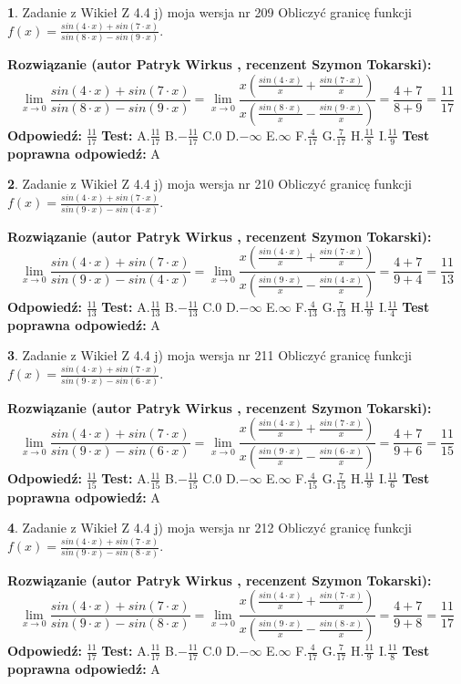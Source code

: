 \documentclass[12pt, a4paper]{article}
\theoremstyle{definition} %
\newtheorem{zad}{}
\newcommand{\zadStart}[1]{\begin{zad}#1\newline}
\newcommand{\zadStop}{\end{zad}}
\newcommand{\rozwStart}[2]{\noindent \textbf{Rozwiązanie (autor #1 , recenzent #2): }\newline}
\newcommand{\rozwStop}{\newline}
\newcommand{\odpStart}{\noindent \textbf{Odpowiedź:}\newline}
\newcommand{\odpStop}{\newline}
\newcommand{\testStart}{\noindent \textbf{Test:}\newline}
\newcommand{\testStop}{\newline}
\newcommand{\kluczStart}{\noindent \textbf{Test poprawna odpowiedź:}\newline}
\newcommand{\kluczStop}{\newline}
\begin{document}
\zadStart{Zadanie z Wikieł Z 4.4 j) moja wersja nr 209}
Obliczyć granicę funkcji $f(x)=\frac{sin(4\cdot x) +sin(7\cdot x)}{sin(8\cdot x) -sin(9\cdot x)}$.
\zadStop
\rozwStart{Patryk Wirkus}{Szymon Tokarski}
$$\lim\limits_{x\to 0}\frac{sin(4\cdot x) +sin(7\cdot x)}{sin(8\cdot x) -sin(9\cdot x)}=\lim\limits_{x\to 0}\frac{x(\frac{sin(4\cdot x)}{x}+\frac{sin(7\cdot x)}{x})}{x(\frac{sin(8\cdot x)}{x}-\frac{sin(9\cdot x)}{x})}=\frac{4+7}{8+9} = \frac{11}{17}$$
\rozwStop
\odpStart
$\frac{11}{17}$
\odpStop
\testStart
A.$\frac{11}{17}$
B.$-\frac{11}{17}$
C.$0$
D.$-\infty$
E.$\infty$
F.$\frac{4}{17}$
G.$\frac{7}{17}$
H.$\frac{11}{8}$
I.$\frac{11}{9}$
\testStop
\kluczStart
A
\kluczStop



\zadStart{Zadanie z Wikieł Z 4.4 j) moja wersja nr 210}
Obliczyć granicę funkcji $f(x)=\frac{sin(4\cdot x) +sin(7\cdot x)}{sin(9\cdot x) -sin(4\cdot x)}$.
\zadStop
\rozwStart{Patryk Wirkus}{Szymon Tokarski}
$$\lim\limits_{x\to 0}\frac{sin(4\cdot x) +sin(7\cdot x)}{sin(9\cdot x) -sin(4\cdot x)}=\lim\limits_{x\to 0}\frac{x(\frac{sin(4\cdot x)}{x}+\frac{sin(7\cdot x)}{x})}{x(\frac{sin(9\cdot x)}{x}-\frac{sin(4\cdot x)}{x})}=\frac{4+7}{9+4} = \frac{11}{13}$$
\rozwStop
\odpStart
$\frac{11}{13}$
\odpStop
\testStart
A.$\frac{11}{13}$
B.$-\frac{11}{13}$
C.$0$
D.$-\infty$
E.$\infty$
F.$\frac{4}{13}$
G.$\frac{7}{13}$
H.$\frac{11}{9}$
I.$\frac{11}{4}$
\testStop
\kluczStart
A
\kluczStop



\zadStart{Zadanie z Wikieł Z 4.4 j) moja wersja nr 211}
Obliczyć granicę funkcji $f(x)=\frac{sin(4\cdot x) +sin(7\cdot x)}{sin(9\cdot x) -sin(6\cdot x)}$.
\zadStop
\rozwStart{Patryk Wirkus}{Szymon Tokarski}
$$\lim\limits_{x\to 0}\frac{sin(4\cdot x) +sin(7\cdot x)}{sin(9\cdot x) -sin(6\cdot x)}=\lim\limits_{x\to 0}\frac{x(\frac{sin(4\cdot x)}{x}+\frac{sin(7\cdot x)}{x})}{x(\frac{sin(9\cdot x)}{x}-\frac{sin(6\cdot x)}{x})}=\frac{4+7}{9+6} = \frac{11}{15}$$
\rozwStop
\odpStart
$\frac{11}{15}$
\odpStop
\testStart
A.$\frac{11}{15}$
B.$-\frac{11}{15}$
C.$0$
D.$-\infty$
E.$\infty$
F.$\frac{4}{15}$
G.$\frac{7}{15}$
H.$\frac{11}{9}$
I.$\frac{11}{6}$
\testStop
\kluczStart
A
\kluczStop



\zadStart{Zadanie z Wikieł Z 4.4 j) moja wersja nr 212}
Obliczyć granicę funkcji $f(x)=\frac{sin(4\cdot x) +sin(7\cdot x)}{sin(9\cdot x) -sin(8\cdot x)}$.
\zadStop
\rozwStart{Patryk Wirkus}{Szymon Tokarski}
$$\lim\limits_{x\to 0}\frac{sin(4\cdot x) +sin(7\cdot x)}{sin(9\cdot x) -sin(8\cdot x)}=\lim\limits_{x\to 0}\frac{x(\frac{sin(4\cdot x)}{x}+\frac{sin(7\cdot x)}{x})}{x(\frac{sin(9\cdot x)}{x}-\frac{sin(8\cdot x)}{x})}=\frac{4+7}{9+8} = \frac{11}{17}$$
\rozwStop
\odpStart
$\frac{11}{17}$
\odpStop
\testStart
A.$\frac{11}{17}$
B.$-\frac{11}{17}$
C.$0$
D.$-\infty$
E.$\infty$
F.$\frac{4}{17}$
G.$\frac{7}{17}$
H.$\frac{11}{9}$
I.$\frac{11}{8}$
\testStop
\kluczStart
A
\kluczStop
\end{document}
